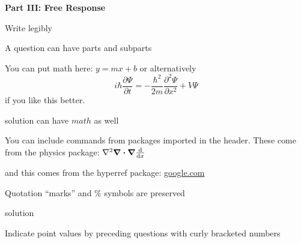 \documentclass{exam}
\begin{document}
\newpage
\par\noindent \textbf{\large  Part III: Free Response}
\par\noindent  Write legibly
\begin{questions}
\setcounter{question}{20}
\question A question can have parts and subparts
\question You can put math here: $y=mx+b$ or alternatively \[i\hbar \frac{\partial \Psi}{\partial t} = -\frac{\hbar^2}{2m}\frac{\partial^2 \Psi}{\partial x^2} + V \Psi\] if you like this better.
	\begin{solution}[20 pt]
	solution can have $math$ as well
	\end{solution}
\question You can include commands from packages imported in the header. These come from the physics package: $\laplacian\div\grad\dv{x}$
	\begin{solution}[20 pt]
	and this comes from the hyperref package: \url{google.com}
	\end{solution}
\question Quotation ``marks'' and \% symbols are preserved
	\begin{solution}[20 pt]
	solution
	\end{solution}
\question[3]  Indicate point values by preceding questions with curly bracketed numbers
	\begin{parts}

\end{parts}
\end{questions}
\end{document}
